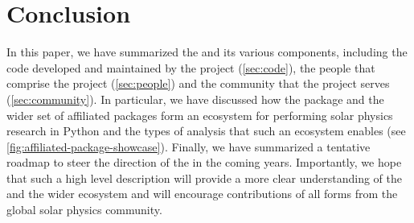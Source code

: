 \section{Conclusion}
\label{sec:conclusion}

In this paper, we have summarized the \sunpyproj and its various components, including the code developed and maintained by the project (\autoref{sec:code}), the people that comprise the project (\autoref{sec:people}) and the community that the project serves (\autoref{sec:community}).
In particular, we have discussed how the \sunpypkg package and the wider set of affiliated packages form an ecosystem for performing solar physics research in Python and the types of analysis that such an ecosystem enables (see \autoref{fig:affiliated-package-showcase}).
Finally, we have summarized a tentative roadmap to steer the direction of the \sunpyproj in the coming years.
Importantly, we hope that such a high level description will provide a more clear understanding of the \sunpyproj and the wider ecosystem and will encourage contributions of all forms from the global solar physics community.
